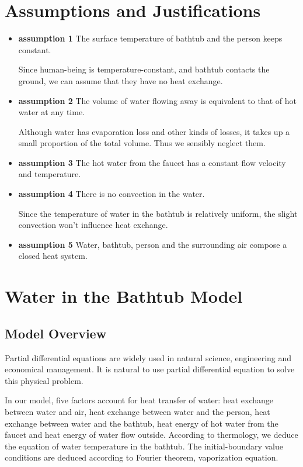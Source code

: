 \documentclass[12pt,a4paper,titlepage]{article}
\begin{document}
\section{Assumptions and Justifications}
\label{sec:assumptions-and-justifications}

\begin{itemize}
\item \textbf{assumption 1} The surface temperature of bathtub and the person keeps constant.

    Since human-being is temperature-constant, and bathtub contacts the ground, we can assume that they have no heat exchange.

\item \textbf{assumption 2} The volume of water flowing away is equivalent to that of hot water at any time.

    Although water has evaporation loss and other kinds of losses,  it takes up a small proportion of the total volume. Thus we sensibly neglect them.

\item \textbf{assumption 3} The hot water from the faucet has a constant flow velocity and temperature.

\item \textbf{assumption 4} There is no convection in the water.

Since the temperature of water in the bathtub is relatively uniform, the slight convection won't influence heat exchange. 

\item \textbf{assumption 5} Water, bathtub, person and the surrounding air compose a closed heat system.
\end{itemize}

\section{Water in the Bathtub Model}
\label{sec:human-capital-model}


\subsection{Model Overview}
\label{sec:model-overview}

Partial differential equations are widely used in natural science, engineering and economical management.
It is natural to use partial differential equation to solve this physical problem.

In our model, five factors account for heat transfer of water: heat exchange between water and air, heat
exchange between water and the person, heat exchange between water and the bathtub, heat energy of hot water from the
faucet and heat energy of water flow outside. According to thermology, we deduce the equation
of water temperature in the bathtub. The initial-boundary value conditions are deduced according to
Fourier theorem, vaporization equation\cite{1}.
\end{document}
